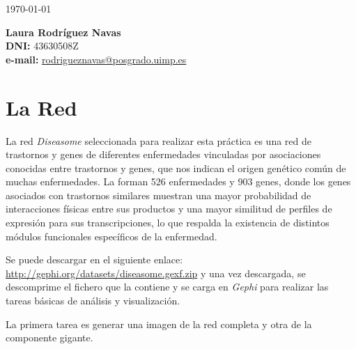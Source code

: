 \documentclass{uimppracticas}
\begin{document}
	
\frontmatter


\begin{center}
\large \today
\end{center}

\vspace{40mm}

\begin{flushright}
 	{\bf Laura Rodríguez Navas}\\
 	\textbf{DNI:} 43630508Z\\
 	\textbf{e-mail:} \href{rodrigueznavas@posgrado.uimp.es}{rodrigueznavas@posgrado.uimp.es}
\end{flushright}

\newpage



\mainmatter

\setlength\parskip{2.5ex}

\section*{La Red}

La red \textit{Diseasome}\cite{Goh8685} seleccionada para realizar esta práctica es una red de trastornos y genes de diferentes enfermedades vinculadas por asociaciones conocidas entre trastornos y genes, que nos indican el origen genético común de muchas enfermedades. La forman 526 enfermedades y 903 genes, donde los genes asociados con trastornos similares muestran una mayor probabilidad de interacciones físicas entre sus productos y una mayor similitud de perfiles de expresión para sus transcripciones, lo que respalda la existencia de distintos módulos funcionales específicos de la enfermedad. 

Se puede descargar en el siguiente enlace: \url{http://gephi.org/datasets/diseasome.gexf.zip} y una vez descargada, se descomprime el fichero que la contiene y se carga en \textit{Gephi}\cite{Gephi} para realizar las tareas básicas de análisis y visualización. 

La primera tarea es generar una imagen de la red completa y otra de la componente gigante. 
\end{document}
